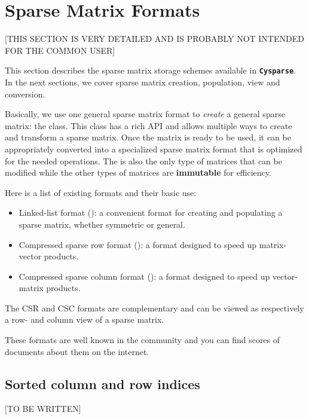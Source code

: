 \documentclass[letterpaper,10pt,english]{sphinxmanual}
\begin{document}
\chapter{Sparse Matrix Formats}
\label{sparse_matrix_formats:sparse-matrix-formats}\label{sparse_matrix_formats::doc}\label{sparse_matrix_formats:id1}
{[}THIS SECTION IS VERY DETAILED AND IS PROBABLY NOT INTENDED FOR THE COMMON USER{]}

This section describes the sparse matrix storage schemes available in
\textbf{\texttt{Cysparse}}. In the next sections, we cover sparse matrix creation, population, view and conversion.

Basically, we use one general sparse matrix format to \emph{create} a general sparse matrix: the  class. This class has
a rich API and allows multiple ways to create and transform a sparse matrix. Once the matrix is ready to be used, it can be appropriately converted
into a specialized sparse matrix format that is optimized for the needed operations. The  is also the only type of matrices that
can be modified while the other types of matrices are \textbf{immutable} for efficiency.

Here is a list of existing formats and their basic use:
\begin{itemize}
\item {} 
Linked-list format (): a convenient format for creating and populating
a sparse matrix, whether symmetric or general.

\item {} 
Compressed sparse row format (): a format designed to speed up
matrix-vector products.

\item {} 
Compressed sparse column format (): a format designed to speed up
vector-matrix products.

\end{itemize}

The CSR and CSC formats are complementary and can be viewed as respectively a row- and column view of a sparse matrix.

These formats are well known in the community and you can find scores of documents about them on the internet.


\section{Sorted column and row indices}
\label{sparse_matrix_formats:sorted-column-and-row-indices}
{[}TO BE WRITTEN{]}
\end{document}
